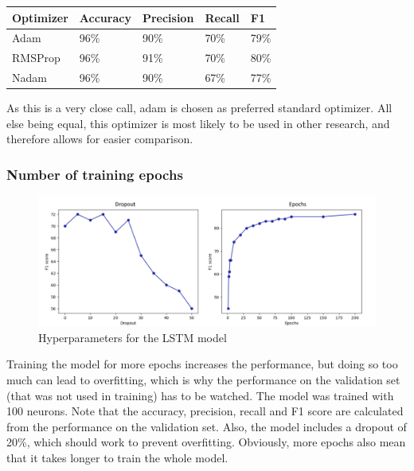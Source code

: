 \documentclass[
a4paper,
pagesize,
pdftex,
12pt,
twoside, %
BCOR=5mm, %
ngerman,
fleqn,
final,
]{scrartcl}
\begin{document}
	\begin{tabular}{ | p{3cm} || p{2cm}|p{2cm}|p{2cm}|p{2cm}|  }
		\hline
		\textbf{Optimizer} & \textbf{Accuracy} & \textbf{Precision} & \textbf{Recall} & \textbf{F1} \\
		\hline
		Adam & 96\%& 90\%& 70\%& 79\% \\
		RMSProp & 96\% &  91\% &  70\% &  80\% \\ 
		Nadam & 96\% & 90\% & 67\% & 77\%\\
		\hline
		\hline
	\end{tabular}
	
	As this is a very close call, adam is chosen as preferred standard optimizer. All else being equal, this optimizer is most likely to be used in other research, and therefore allows for easier comparison.
	
	\subsubsection{Number of training epochs}
	
			\begin{figure}[h]
		\centering
		\includegraphics[width=1\textwidth]{img/hyper2}
		\caption{Hyperparameters for the LSTM model}
		\label{fig:hyper2}
	\end{figure}
	
	Training the model for more epochs increases the performance, but doing so too much can lead to overfitting, which is why the performance on the validation set (that was not used in training) has to be watched. The model was trained with 100 neurons. Note that the accuracy, precision, recall and F1 score are calculated from the performance on the validation set. Also, the model includes a dropout of 20\%, which should work to prevent overfitting. Obviously, more epochs also mean that it takes longer to train the whole model.
	
\end{document}
